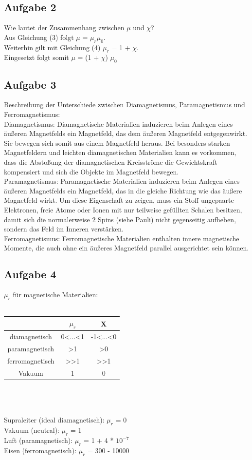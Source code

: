 \documentclass[a4paper,10pt]{scrartcl}
\begin{document}
\subsection{Aufgabe 2}
Wie lautet der Zusammenhang zwischen $\mu$ und $\chi$?\\
Aus Gleichung (3) folgt $\mu$ = $\mu_r$$\mu_0$. \\
Weiterhin gilt mit Gleichung (4) $\mu_r$ = 1 + $\chi$. \\
Eingesetzt folgt somit $\mu$ = (1 + $\chi$) $\mu_0$

\subsection{Aufgabe 3}
Beschreibung der Unterschiede zwischen Diamagnetismus, Paramagnetismus und Ferromagnetismus: \\
Diamagnetismus: Diamagnetische Materialien induzieren beim Anlegen eines äußeren Magnetfelds ein Magnetfeld, das dem äußeren Magnetfeld entgegenwirkt. Sie bewegen sich somit aus einem Magnetfeld heraus. Bei besonders starken Magnetfeldern und leichten diamagnetischen Materialien kann es vorkommen, dass die Abstoßung der diamagnetischen Kreisströme die Gewichtskraft kompensiert und sich die Objekte im Magnetfeld bewegen. \\
Paramagnetismus: Paramagnetische Materialien induzieren beim Anlegen eines äußeren Magnetfelds ein Magnetfeld, das in die gleiche Richtung wie das äußere Magnetfeld wirkt. Um diese Eigenschaft zu zeigen, muss ein Stoff ungepaarte Elektronen, freie Atome oder Ionen mit nur teilweise gefüllten Schalen besitzen, damit sich die normalerweise 2 Spins (siehe Pauli) nicht gegenseitig aufheben, sondern das Feld im Inneren verstärken. \\
Ferromagnetismus: Ferromagnetische Materialien enthalten innere magnetische Momente, die auch ohne ein äußeres Magnetfeld parallel ausgerichtet sein können.
\subsection{Aufgabe 4}
$\mu_r$ für magnetische Materialien: \\ \\
\begin{tabular}{|c|c|c|} \hline
	 & $\mu_r$ & X \\ \hline
	diamagnetisch & 0<...<1 & -1<...<0 \\ \hline
	paramagnetisch & >1 & >0 \\ \hline
	ferromagnetisch & >>1 & >>1 \\ \hline
	Vakuum & 1 & 0 \\ \hline
\end{tabular} \\ \\ \\
Supraleiter (ideal diamagnetisch): $\mu_r$ = 0 \\
Vakuum (neutral): $\mu_r$ = 1 \\
Luft (paramagnetisch):  $\mu_r$ = 1 + 4 * $10^{-7}$ \\
Eisen (ferromagnetisch):  $\mu_r$ = 300 - 10000 \\
\end{document}
